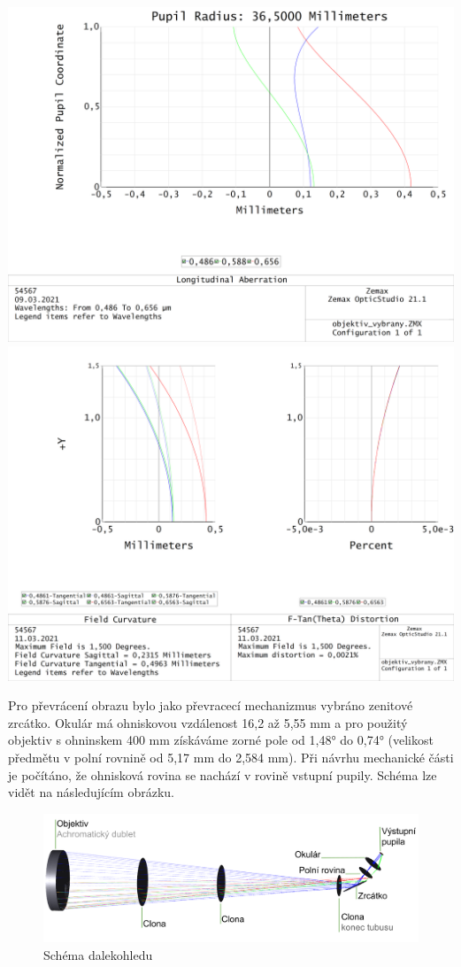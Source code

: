 \documentclass[
]{article}
\begin{document}
\includegraphics{imgs/LongitudinalAberration_dudlet.png}
\includegraphics{imgs/FieldCurvDist_dublet.png}

Pro převrácení obrazu bylo jako převracecí mechanizmus vybráno zenitové
zrcátko. Okulár má ohniskovou vzdálenost 16,2 až 5,55 mm a pro použitý
objektiv s ohninskem 400 mm získáváme zorné pole od 1,48° do 0,74°
(velikost předmětu v polní rovnině od 5,17 mm do 2,584 mm). Při návrhu
mechanické části je počítáno, že ohnisková rovina se nachází v rovině
vstupní pupily. Schéma lze vidět na následujícím obrázku.

\begin{figure}
\centering
\includegraphics{imgs/schema.png}
\caption{Schéma dalekohledu}
\end{figure}
\end{document}

